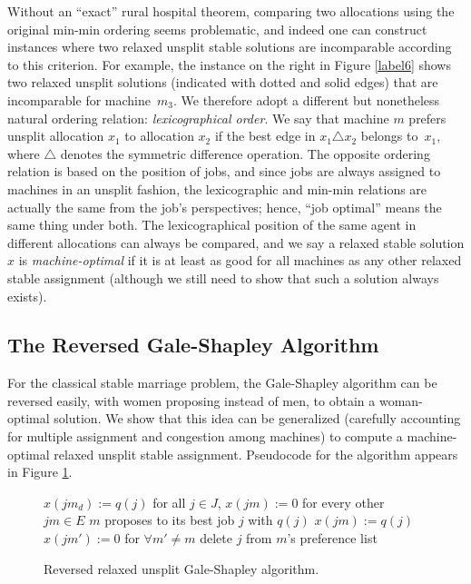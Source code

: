 \documentclass{llncs}
\newcommand{\mycaption}[2]
 {\begin{center} \parbox{4in}{\caption{\small #2 \label{#1}}} \end{center}}
\begin{document}
Without an ``exact'' rural hospital theorem, comparing two allocations
using the original min-min ordering seems problematic, and indeed one
can construct instances where two relaxed unsplit stable solutions are
incomparable according to this criterion.  For example, the instance
on the right in Figure \ref{label6} shows two relaxed unsplit
solutions (indicated with dotted and solid edges) that are
incomparable for machine~$m_3$. We therefore adopt a different but
nonetheless natural ordering relation: \emph{lexicographical
  order}. We say that machine $m$ prefers unsplit allocation $x_1$ to
allocation $x_2$ if the best edge in $x_1 \triangle x_2$ belongs
to~$x_1$, where $\triangle$ denotes the symmetric difference
operation.  The opposite ordering relation is based on the position of
jobs, and since jobs are always assigned to machines in an unsplit
fashion, the lexicographic and min-min relations are actually the same
from the job's perspectives; hence, ``job optimal'' means the same
thing under both.  The lexicographical position of the same agent in
different allocations can always be compared, and we say a relaxed
stable solution $x$ is \emph{machine-optimal} if it is at least as
good for all machines as any other relaxed stable assignment (although
we still need to show that such a solution always exists).

\subsection{The Reversed Gale-Shapley Algorithm}

For the classical stable marriage problem, the Gale-Shapley algorithm
can be reversed easily, with women proposing instead of men, to obtain
a woman-optimal solution.  We show that this idea can be generalized
(carefully accounting for multiple assignment and congestion among
machines) to compute a machine-optimal relaxed unsplit stable
assignment.  Pseudocode for the algorithm appears in Figure \ref{rev_gs}.

\begin{figure}[t]
\begin{center}
\begin{algorithmic}[1]
	\State $x(jm_d) := q(j)$ for all $j \in J$, $x(jm) := 0$ for every other $jm \in E$ 
		\State $m$ proposes to its best job $j$ with $q(j)$
			\State $x(jm) := q(j)$
			\State $x(jm') := 0$ for $\forall m' \neq m$
		\EndIf
			\State delete $j$ from $m$'s preference list
	\EndWhile
\end{algorithmic}
\vspace*{-0.1in}
\end{center}
\mycaption{rev_gs}{Reversed relaxed unsplit Gale-Shapley algorithm.}
\end{figure}
\end{document}
